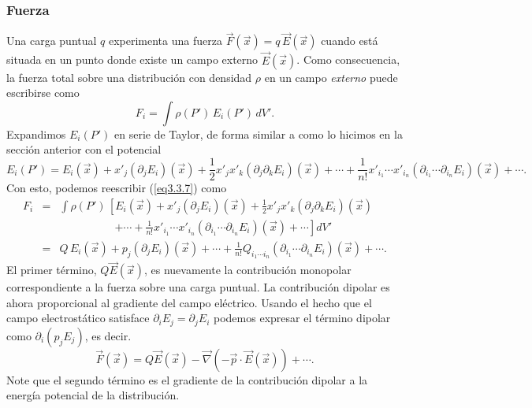 \subsubsection{Fuerza}  \label{ed3_3_2}

Una carga puntual $q$ experimenta una fuerza
$\vec{F}(\vec{x})=q\,\vec{E}(\vec{x})$ cuando está situada en
un punto donde existe un campo externo $\vec{E}(\vec{x})$. Como consecuencia,
la fuerza total sobre una distribución con densidad $\rho$ en un campo
\textit{externo} puede escribirse como
\begin{equation} \label{eq3.3.7}
F_i=\int \rho(P')\,E_i(P')\,dV'.
\end{equation}
Expandimos $E_i(P')$ en serie de Taylor, de forma similar a como lo
hicimos en la sección anterior con el potencial
\begin{equation} \label{eq3.3.7.1}
E_i(P')=E_i(\vec{x})+x'_j(\partial_jE_i)(\vec{x})+\frac{1}{
2}x'_jx'_k(\partial_j\partial_kE_i)(\vec{x})
+\cdots+\frac{1}{n!}x'_{i_1}\cdots
x'_{i_n}(\partial_{i_1}\cdots\partial_{i_n}E_i)(\vec {x})+\cdots .
\end{equation}
Con esto, podemos reescribir (\ref{eq3.3.7}) como
\begin{eqnarray}
F_i&=& \int
\rho(P')\,\left[E_i(\vec{x})+x'_j(\partial_jE_i)(\vec{x})+\frac{1}{
2}x'_jx'_k(\partial_j\partial_kE_i)(\vec{x}) \right.\nonumber\\
&& \quad\qquad\qquad \left. +\cdots+\frac{1}{n!}x'_{i_1}\cdots
x'_{i_n}(\partial_{i_1}\cdots\partial_{i_n}E_i)(\vec {x})+\cdots\right] dV' \\
&=&
Q\,E_i(\vec{x})+p_j(\partial_jE_i)(\vec{x})+\cdots+\frac{1}{n!}Q_{i_1\cdots i_n}
(\partial_{i_1}\cdots\partial_{i_n}E_i)(\vec {x})+\cdots .\label{eq3.3.8}
\end{eqnarray}
El primer término, $Q\vec{E}(\vec{x})$, es nuevamente la contribución monopolar correspondiente a la fuerza sobre una carga puntual. La contribución
dipolar es ahora proporcional al gradiente del campo eléctrico. Usando el hecho que el campo electrostático satisface
$\partial_iE_j=\partial_jE_i$ podemos expresar el término dipolar como $\partial_i(p_jE_j)$,
es decir.
\begin{equation} \label{eq3.3.12}
\boxed{\vec{F}(\vec{x}) =
Q\vec{E}(\vec{x})-\vec{\nabla}\left(-\vec{p}\cdot\vec{E}(\vec{x})\right)+\cdots.
}
\end{equation}
Note que el segundo término es el gradiente de la contribución dipolar a la
energía potencial de la distribución.

